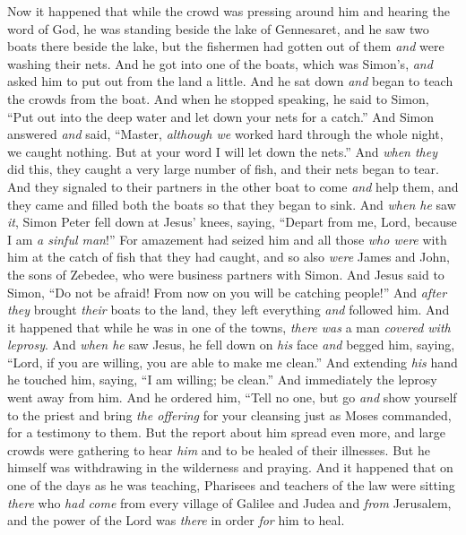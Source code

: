 \begin{biblechapter} %
 Now it happened that while the crowd was pressing around him and hearing the word of God, he was standing beside the lake of Gennesaret,
\verse and he saw two boats there beside the lake, but the fishermen had gotten out of them \textit{and} were washing their nets.
\verse And he got into one of the boats, which was Simon’s, \textit{and} asked him to put out from the land a little. And he sat down \textit{and} began to teach the crowds from the boat.
\verse And when he stopped speaking, he said to Simon, “Put out into the deep water and let down your nets for a catch.”
\verse And Simon answered \textit{and} said, “Master, \textit{although we} worked hard through the whole night, we caught nothing. But at your word I will let down the nets.”
\verse And \textit{when they} did this, they caught a very large number of fish, and their nets began to tear.
\verse And they signaled to their partners in the other boat to come \textit{and} help them, and they came and filled both the boats so that they began to sink.
\verse And \textit{when he} saw \textit{it}, Simon Peter fell down at Jesus’ knees, saying, “Depart from me, Lord, because I am \textit{a sinful man}!”
\verse For amazement had seized him and all those \textit{who were} with him at the catch of fish that they had caught,
\verse and so also \textit{were} James and John, the sons of Zebedee, who were business partners with Simon. And Jesus said to Simon, “Do not be afraid! From now on you will be catching people!”
\verse And \textit{after they} brought \textit{their} boats to the land, they left everything \textit{and} followed him.
 And it happened that while he was in one of the towns, \textit{there was} a man \textit{covered with leprosy}. And \textit{when he} saw Jesus, he fell down on \textit{his} face \textit{and} begged him, saying, “Lord, if you are willing, you are able to make me clean.”
\verse And extending \textit{his} hand he touched him, saying, “I am willing; be clean.” And immediately the leprosy went away from him.
\verse And he ordered him, “Tell no one, but go \textit{and} show yourself to the priest and bring \textit{the offering} for your cleansing just as Moses commanded, for a testimony to them.
\verse But the report about him spread even more, and large crowds were gathering to hear \textit{him} and to be healed of their illnesses.
\verse But he himself was withdrawing in the wilderness and praying.
 And it happened that on one of the days as he was teaching, Pharisees and teachers of the law were sitting \textit{there} who \textit{had come} from every village of Galilee and Judea and \textit{from} Jerusalem, and the power of the Lord was \textit{there} in order \textit{for} him to heal.

\end{biblechapter}
